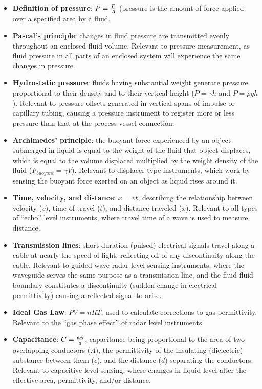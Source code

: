 \begin{itemize}
\item \textbf{Definition of pressure}: $P = {F \over A}$ (pressure is the amount of force applied over a specified area by a fluid.
\item \textbf{Pascal's principle}: changes in fluid pressure are transmitted evenly throughout an enclosed fluid volume.  Relevant to pressure measurement, as fluid pressure in all parts of an enclosed system will experience the same changes in pressure.
\item \textbf{Hydrostatic pressure}: fluids having substantial weight generate pressure proportional to their density and to their vertical height ($P = \gamma h$ and $P = \rho g h$).  Relevant to pressure offsets generated in vertical spans of impulse or capillary tubing, causing a pressure instrument to register more or less pressure than that at the process vessel connection.
\item \textbf{Archimedes' principle}: the buoyant force experienced by an object submerged in liquid is equal to the weight of the fluid that object displaces, which is equal to the volume displaced multiplied by the weight density of the fluid ($F_{buoyant} = \gamma V$).  Relevant to displacer-type instruments, which work by sensing the buoyant force exerted on an object as liquid rises around it.
\item \textbf{Time, velocity, and distance}: $x = vt$, describing the relationship between velocity ($v$), time of travel ($t$), and distance traveled ($x$).  Relevant to all types of ``echo'' level instruments, where travel time of a wave is used to measure distance.
\item \textbf{Transmission lines}: short-duration (pulsed) electrical signals travel along a cable at nearly the speed of light, reflecting off of any discontinuity along the cable.  Relevant to guided-wave radar level-sensing instruments, where the waveguide serves the same purpose as a transmission line, and the fluid-fluid boundary constitutes a discontinuity (sudden change in electrical permittivity) causing a reflected signal to arise.
\item \textbf{Ideal Gas Law}: $PV = nRT$, used to calculate corrections to gas permittivity.  Relevant to the ``gas phase effect'' of radar level instruments.
\item \textbf{Capacitance}: $C = {{\epsilon A} \over d}$, capacitance being proportional to the area of two overlapping conductors ($A$), the permittivity of the insulating (dielectric) substance between them ($\epsilon$), and the distance ($d$) separating the conductors.  Relevant to capacitive level sensing, where changes in liquid level alter the effective area, permittivity, and/or distance.
\end{itemize}










